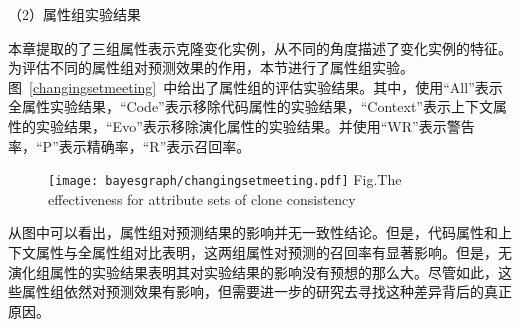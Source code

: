 
（2）属性组实验结果

本章提取的了三组属性表示克隆变化实例，从不同的角度描述了变化实例的特征。为评估不同的属性组对预测效果的作用，本节进行了属性组实验。图~\ref{changingsetmeeting}~中给出了属性组的评估实验结果。其中，使用“All”表示全属性实验结果，“Code”表示移除代码属性的实验结果，“Context”表示上下文属性的实验结果，“Evo”表示移除演化属性的实验结果。并使用“WR”表示警告率，“P”表示精确率，“R”表示召回率。

\begin{figure}[h]
\centering
\texttt{[image: bayesgraph/changingsetmeeting.pdf]}
{Fig.$\!$}{The effectiveness for attribute sets of clone consistency}
\vspace{-1em}
\end{figure}

从图中可以看出，属性组对预测结果的影响并无一致性结论。但是，代码属性和上下文属性与全属性组对比表明，这两组属性对预测的召回率有显著影响。但是，无演化组属性的实验结果表明其对实验结果的影响没有预想的那么大。尽管如此，这些属性组依然对预测效果有影响，但需要进一步的研究去寻找这种差异背后的真正原因。

